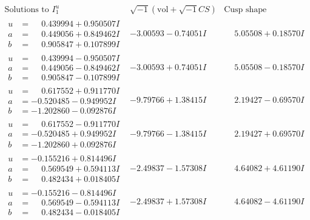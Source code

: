 \documentclass[1p]{elsarticle_modified}
\theoremstyle{definition}
\newcommand{\I}{\sqrt{-1}}
\begin{document}
$$\begin{array}{c|c|c}  
\text{Solutions to }I^u_{1}& \I (\text{vol} + \sqrt{-1}CS) & \text{Cusp shape}\\
 \hline 
\begin{aligned}
u &= \phantom{-}0.439994 + 0.950507 I \\
a &= \phantom{-}0.449056 + 0.849462 I \\
b &= \phantom{-}0.905847 + 0.107899 I\end{aligned}
 & -3.00593 - 0.74051 I & \phantom{-}5.05508 + 0.18570 I \\ \hline\begin{aligned}
u &= \phantom{-}0.439994 - 0.950507 I \\
a &= \phantom{-}0.449056 - 0.849462 I \\
b &= \phantom{-}0.905847 - 0.107899 I\end{aligned}
 & -3.00593 + 0.74051 I & \phantom{-}5.05508 - 0.18570 I \\ \hline\begin{aligned}
u &= \phantom{-}0.617552 + 0.911770 I \\
a &= -0.520485 - 0.949952 I \\
b &= -1.202860 - 0.092876 I\end{aligned}
 & -9.79766 + 1.38415 I & \phantom{-}2.19427 - 0.69570 I \\ \hline\begin{aligned}
u &= \phantom{-}0.617552 - 0.911770 I \\
a &= -0.520485 + 0.949952 I \\
b &= -1.202860 + 0.092876 I\end{aligned}
 & -9.79766 - 1.38415 I & \phantom{-}2.19427 + 0.69570 I \\ \hline\begin{aligned}
u &= -0.155216 + 0.814496 I \\
a &= \phantom{-}0.569549 + 0.594113 I \\
b &= \phantom{-}0.482434 + 0.018405 I\end{aligned}
 & -2.49837 - 1.57308 I & \phantom{-}4.64082 + 4.61190 I \\ \hline\begin{aligned}
u &= -0.155216 - 0.814496 I \\
a &= \phantom{-}0.569549 - 0.594113 I \\
b &= \phantom{-}0.482434 - 0.018405 I\end{aligned}
 & -2.49837 + 1.57308 I & \phantom{-}4.64082 - 4.61190 I \\ \hline\begin{aligned}

\end{aligned}
\end{array}$$
\end{document}

